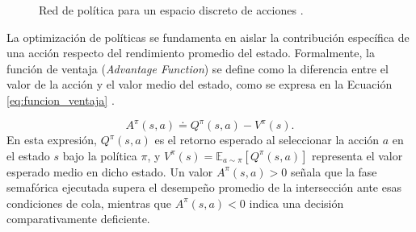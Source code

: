 \begin{figure}[!htbp]
{%
    }
    \caption[Red de política para un espacio discreto de acciones]{Red de política para un espacio discreto de acciones \cite{suttonRL,konda2003actorcritic}.}
    \label{fig:red_politica}
\end{figure}

\begingroup
{}
La optimización de políticas se fundamenta en aislar la contribución específica de una acción respecto del rendimiento promedio del estado. Formalmente, la función de ventaja (\textit{Advantage Function}) se define como la diferencia entre el valor de la acción y el valor medio del estado, como se expresa en la Ecuación \eqref{eq:funcion_ventaja} \cite{suttonRL}.
\par
\endgroup
\begin{equation}
    A^\pi(s, a) \doteq Q^\pi(s, a) - V^\pi(s).
    \label{eq:funcion_ventaja}
\end{equation}
En esta expresión, $Q^\pi(s, a)$ es el retorno esperado al seleccionar la acción $a$ en el estado $s$ bajo la política $\pi$, y $V^\pi(s) = \mathbb{E}_{a\sim\pi}[Q^\pi(s,a)]$ representa el valor esperado medio en dicho estado. Un valor $A^\pi(s, a) > 0$ señala que la fase semafórica ejecutada supera el desempeño promedio de la intersección ante esas condiciones de cola, mientras que $A^\pi(s, a) < 0$ indica una decisión comparativamente deficiente.

